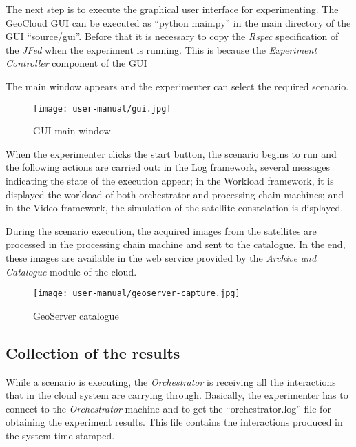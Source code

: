 The next step is to execute the graphical user interface for experimenting. The
GeoCloud \ac{GUI} can be executed as ``python main.py'' in the main directory of
the \ac{GUI} ``source/gui''. Before that it is necessary to copy the
\emph{Rspec} specification of the \emph{JFed} when the experiment is
running. This is because the \emph{Experiment Controller} component of the
\ac{GUI} 

The main window appears and the experimenter can select the required scenario.
\begin{figure}[!h]
\begin{center}
\texttt{[image: user-manual/gui.jpg]}
\caption{GUI main window}
\label{fig:gui}
\end{center}
\end{figure}

When the experimenter clicks the start button, the scenario begins to run and
the following actions are carried out: in the Log framework, several messages indicating the state of the execution
appear; in the Workload framework, it is displayed the workload of both orchestrator and
processing chain machines; and in the Video framework, the simulation of the
satellite constelation is displayed.

During the scenario execution, the acquired images from the satellites are processed
in the processing chain machine and sent to the catalogue. 
In the end, these images are available
in the web service provided by the \emph{Archive and Catalogue} module of the
cloud. 


\begin{figure}[!h]
\begin{center}
\texttt{[image: user-manual/geoserver-capture.jpg]}
\caption{GeoServer catalogue}
\label{fig:images-catalogued}
\end{center}
\end{figure}


\subsection{Collection of the results}

While a scenario is executing, the \emph{Orchestrator} is receiving all the
interactions that in the cloud system are carrying through. 
Basically, the experimenter has to connect to the \emph{Orchestrator} machine
and to get the ``orchestrator.log'' file for obtaining the experiment results.
This file contains the interactions produced in the system time stamped.
